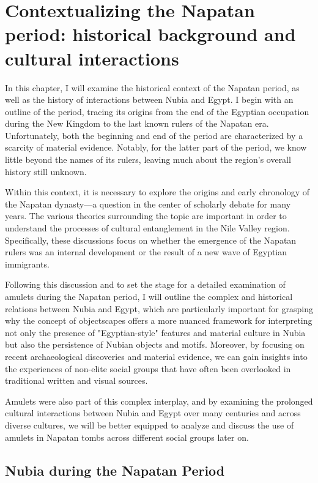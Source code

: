 \chapter{Contextualizing the Napatan period: historical background and cultural interactions}


In this chapter, I will examine the historical context of the Napatan period, as well as the history of interactions between Nubia and Egypt. I begin with an outline of the period, tracing its origins from the end of the Egyptian occupation during the New Kingdom to the last known rulers of the Napatan era. Unfortunately, both the beginning and end of the period are characterized by a scarcity of material evidence. Notably, for the latter part of the period, we know little beyond the names of its rulers, leaving much about the region's overall history still unknown.


Within this context, it is necessary to explore the origins and early chronology of the Napatan dynasty---a question in the center of scholarly debate for many years. The various theories surrounding the topic are important in order to understand the processes of cultural entanglement in the Nile Valley region. Specifically, these discussions focus on whether the emergence of the Napatan rulers was an internal development or the result of a new wave of Egyptian immigrants.


Following this discussion and to set the stage for a detailed examination of amulets during the Napatan period, I will outline the complex and historical relations between Nubia and Egypt, which are particularly important for grasping why the concept of objectscapes offers a more nuanced framework for interpreting not only the presence of "Egyptian-style" features and material culture in Nubia but also the persistence of Nubian objects and motifs. Moreover, by focusing on recent archaeological discoveries and material evidence, we can gain insights into the experiences of non-elite social groups that have often been overlooked in traditional written and visual sources.


Amulets were also part of this complex interplay, and by examining the prolonged cultural interactions between Nubia and Egypt over many centuries and across diverse cultures, we will be better equipped to analyze and discuss the use of amulets in Napatan tombs across different social groups later on.


\section{Nubia during the Napatan Period}


